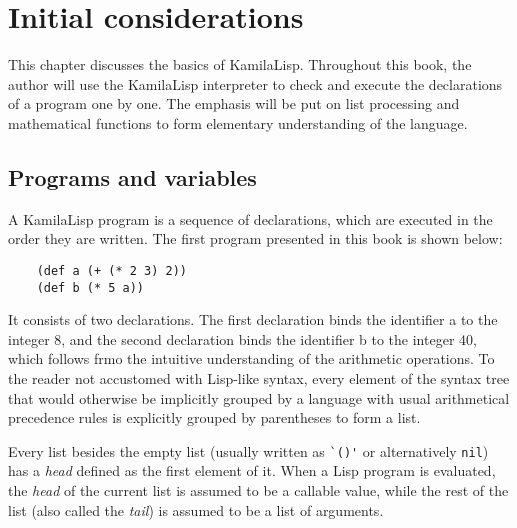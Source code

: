 
\chapter{Initial considerations}

This chapter discusses the basics of KamilaLisp. Throughout this book, the author will use the KamilaLisp interpreter to check and execute the declarations of a program one by one. The emphasis will be put on list processing and mathematical functions to form elementary understanding of the language.

\section{Programs and variables}

A KamilaLisp program is a sequence of declarations, which are executed in the order they are written. The first program presented in this book is shown below:

\begin{verbatim}
    (def a (+ (* 2 3) 2))
    (def b (* 5 a))
\end{verbatim}

It consists of two declarations. The first declaration binds the identifier a to the integer 8, and the second declaration binds the identifier b to the integer 40, which follows frmo the intuitive understanding of the arithmetic operations. To the reader not accustomed with Lisp-like syntax, every element of the syntax tree that would otherwise be implicitly grouped by a language with usual arithmetical precedence rules is explicitly grouped by parentheses to form a list.

Every list besides the empty list (usually written as \verb|`()'| or alternatively \verb|nil|) has a \textit{head} defined as the first element of it. When a Lisp program is evaluated, the \textit{head} of the current list is assumed to be a callable value, while the rest of the list (also called the \textit{tail}) is assumed to be a list of arguments.
